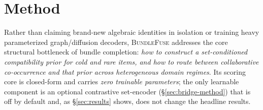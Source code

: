 \section{Method}
\label{sec:method}

Rather than claiming brand-new algebraic identities in isolation or training heavy parameterized graph/diffusion
decoders, \textsc{BundleFuse} addresses the core structural bottleneck of bundle completion: \emph{how to construct a
set-conditioned compatibility prior for cold and rare items, and how to route between collaborative co-occurrence and
that prior across heterogeneous domain regimes}. Its scoring core is closed-form and carries \emph{zero trainable
parameters}; the only learnable component is an optional contrastive set-encoder (\S\ref{sec:bridge-method}) that is
off by default and, as \S\ref{sec:results} shows, does not change the headline results.


